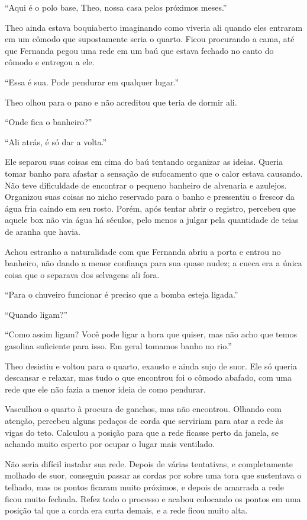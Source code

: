 ``Aqui é o polo base, Theo, nossa casa pelos próximos meses.''

Theo ainda estava boquiaberto imaginando como viveria ali quando eles
entraram em um cômodo que supostamente seria o quarto. Ficou
procurando a cama, até que Fernanda pegou uma rede em um baú
que estava fechado no canto do cômodo e entregou a ele.

``Essa é sua. Pode pendurar em qualquer lugar.''

Theo olhou para o pano e não acreditou que teria de dormir ali.

``Onde fica o banheiro?''

``Ali atrás, é só dar a volta.''

Ele separou suas coisas em cima do baú tentando organizar as ideias.
Queria tomar banho para afastar a sensação de sufocamento que o calor
estava causando. Não teve dificuldade de encontrar o pequeno banheiro de
alvenaria e azulejos. Organizou suas coisas no nicho reservado para o
banho e pressentiu o frescor da água fria caindo em seu rosto. Porém,
após tentar abrir o registro, percebeu que aquele box não via água há
séculos, pelo menos a julgar pela quantidade de teias de aranha
que havia.

Achou estranho a naturalidade com que Fernanda abriu a porta e entrou no
banheiro, não dando a menor confiança para sua quase nudez; a cueca era
a única coisa que o separava dos selvagens ali fora.

``Para o chuveiro funcionar é preciso que a bomba esteja ligada.''

``Quando ligam?''

``Como assim ligam? Você pode ligar a hora que quiser, mas não acho que
temos gasolina suficiente para isso. Em geral tomamos banho no rio.''

Theo desistiu e voltou para o quarto, exausto e ainda sujo de suor. Ele
só queria descansar e relaxar, mas tudo o que encontrou foi o cômodo
abafado, com uma rede que ele não fazia a menor ideia de como pendurar.

Vasculhou o quarto à procura de ganchos, mas não encontrou. Olhando com
atenção, percebeu alguns pedaços de corda que serviriam para atar a rede
às vigas do teto. Calculou a posição para que a rede ficasse perto da
janela, se achando muito esperto por ocupar o lugar mais ventilado.

Não seria difícil instalar sua rede. Depois de várias tentativas, e
completamente molhado de suor, conseguiu passar as cordas por sobre uma
tora que sustentava o telhado, mas os pontos ficaram muito próximos, e
depois de amarrada a rede ficou muito fechada. Refez todo o processo e
acabou colocando os pontos em uma posição tal que a corda era curta
demais, e a rede ficou muito alta.


